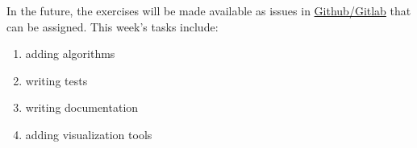 \documentclass[a4paper,12pt]{report}
\begin{document}


In the future, the exercises will be made available as issues in \href{https://gitlab.com/aferdina/MultiArmedBandits/-/issues}{Github/Gitlab} that can be assigned.
This week's tasks include:
\begin{enumerate}
    \item adding algorithms
    \item writing tests
    \item writing documentation
    \item adding visualization tools
\end{enumerate}
\end{document}
